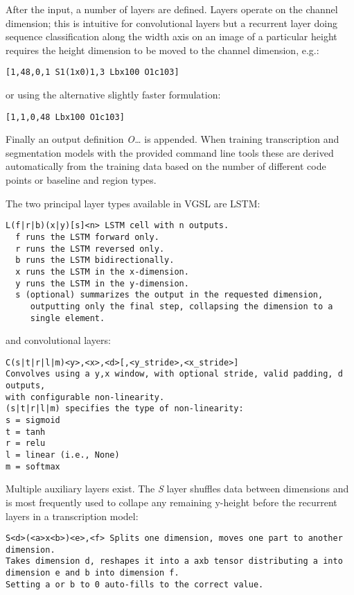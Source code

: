 After the input, a number of layers are defined. Layers operate on the channel
dimension; this is intuitive for convolutional layers but a recurrent layer
doing sequence classification along the width axis on an image of a particular
height requires the height dimension to be moved to the channel dimension,
e.g.:

\begin{verbatim}
[1,48,0,1 S1(1x0)1,3 Lbx100 O1c103]
\end{verbatim}

or using the alternative slightly faster formulation:

\begin{verbatim}        
[1,1,0,48 Lbx100 O1c103]
\end{verbatim}

Finally an output definition \emph{O\dots} is appended. When training
transcription and segmentation models with the provided command line tools
these are derived automatically from the training data based on the number of
different code points or baseline and region types.

The two principal layer types available in VGSL are LSTM:

\begin{verbatim}
L(f|r|b)(x|y)[s]<n> LSTM cell with n outputs.
  f runs the LSTM forward only.
  r runs the LSTM reversed only.
  b runs the LSTM bidirectionally.
  x runs the LSTM in the x-dimension.
  y runs the LSTM in the y-dimension.
  s (optional) summarizes the output in the requested dimension,
     outputting only the final step, collapsing the dimension to a
     single element.
\end{verbatim}

and convolutional layers:

\begin{verbatim}
C(s|t|r|l|m)<y>,<x>,<d>[,<y_stride>,<x_stride>]
Convolves using a y,x window, with optional stride, valid padding, d outputs,
with configurable non-linearity.
(s|t|r|l|m) specifies the type of non-linearity:
s = sigmoid
t = tanh
r = relu
l = linear (i.e., None)
m = softmax
\end{verbatim}

Multiple auxiliary layers exist. The \emph{S} layer shuffles data between
dimensions and is most frequently used to collape any remaining y-height before
the recurrent layers in a transcription model:

\begin{verbatim}
S<d>(<a>x<b>)<e>,<f> Splits one dimension, moves one part to another dimension.
Takes dimension d, reshapes it into a axb tensor distributing a into
dimension e and b into dimension f. 
Setting a or b to 0 auto-fills to the correct value.
\end{verbatim}

